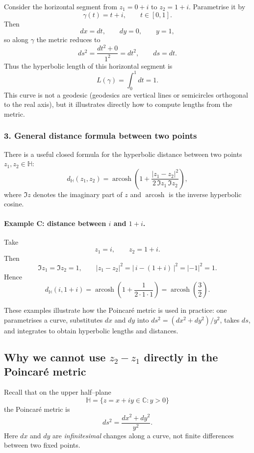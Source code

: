 \documentclass[12pt,a4paper]{article}
\theoremstyle{plain}
\theoremstyle{definition}      %
\begin{document}
Consider the horizontal segment from $z_{1} = 0 + i$ to $z_{2} = 1 + i$.
Parametrise it by
\[
\gamma(t) = t + i,\qquad t\in[0,1].
\]
Then
\[
dx = dt,\qquad dy = 0,\qquad y = 1,
\]
so along $\gamma$ the metric reduces to
\[
ds^{2} = \frac{dt^{2} + 0}{1^{2}} = dt^{2},
\qquad ds = dt.
\]
Thus the hyperbolic length of this horizontal segment is
\[
L(\gamma) = \int_{0}^{1} dt = 1.
\]
This curve is not a geodesic (geodesics are vertical lines or semicircles
orthogonal to the real axis), but it illustrates directly how to compute
lengths from the metric.

\subsubsection*{3. General distance formula between two points}

There is a useful closed formula for the hyperbolic distance between two
points $z_{1},z_{2}\in\mathbb H$:
\[
d_{\mathbb H}(z_{1},z_{2})
= \operatorname{arcosh}\!\left(
1 + \frac{|z_{1}-z_{2}|^{2}}{2\,\Im z_{1}\,\Im z_{2}}
\right),
\]
where $\Im z$ denotes the imaginary part of $z$ and
$\operatorname{arcosh}$ is the inverse hyperbolic cosine.

\paragraph{Example C: distance between $i$ and $1+i$.}
Take
\[
z_{1} = i, \qquad z_{2} = 1+i.
\]
Then
\[
\Im z_{1} = \Im z_{2} = 1,
\qquad
|z_{1}-z_{2}|^{2}
= |\,i - (1+i)\,|^{2}
= |-1|^{2}
= 1.
\]
Hence
\[
d_{\mathbb H}(i,1+i)
= \operatorname{arcosh}\!\left(
1 + \frac{1}{2\cdot 1\cdot 1}
\right)
= \operatorname{arcosh}\!\left(\frac{3}{2}\right).
\]

These examples illustrate how the Poincaré metric is used in practice:
one parametrises a curve, substitutes $dx$ and $dy$ into
$ds^{2}=(dx^{2}+dy^{2})/y^{2}$, takes $ds$, and integrates to obtain
hyperbolic lengths and distances.

\subsection*{Why we cannot use $z_{2}-z_{1}$ directly in the Poincaré metric}

Recall that on the upper half--plane
\[
\mathbb H = \{ z = x+iy \in \mathbb C : y>0\}
\]
the Poincaré metric is
\[
ds^{2} = \frac{dx^{2} + dy^{2}}{y^{2}}.
\]
Here $dx$ and $dy$ are \emph{infinitesimal} changes along a curve, not
finite differences between two fixed points.
\end{document}
